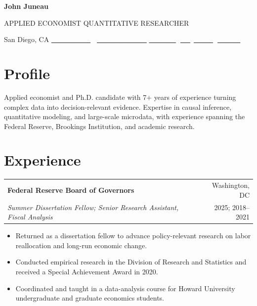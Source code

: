 \documentclass[10pt,letterpaper]{article}
\makeatletter
\newcommand{\entry}[4]{%
  \begin{tabularx}{\linewidth}{@{}Xr@{}}
    {\fontsize{10.35}{11.5}\selectfont\bfseries\color{navy}#1} &
    {\headingfont\fontsize{9.2}{10.5}\selectfont\color{slate}#2} \\
    {\fontsize{9.7}{10.8}\selectfont\itshape#3} &
    {\headingfont\fontsize{9.2}{10.5}\selectfont\color{teal}#4}
  \end{tabularx}\vspace{-1.5pt}
}
\makeatother
\begin{document}

\color{white}
{\fontsize{30}{32}\selectfont\bfseries John Juneau}\par
\vspace{1pt}
{\headingfont\fontsize{10.2}{12}\selectfont{}
  APPLIED ECONOMIST \enspace\textcolor{teal}{\textbullet}\enspace QUANTITATIVE RESEARCHER
}\par
\vspace{9pt}
{\headingfont\fontsize{8.9}{10.5}\selectfont
  San Diego, CA
  \enspace\textcolor{teal}{\textbullet}\enspace
  \href{tel:+12243307443}{\textcolor{white}{224-330-7443}}
  \enspace\textcolor{teal}{\textbullet}\enspace
  \href{mailto:jjuneau@ucsd.edu}{\textcolor{white}{jjuneau@ucsd.edu}}
  \enspace\textcolor{teal}{\textbullet}\enspace
  \href{https://www.linkedin.com/in/john-juneau-016022100/}{\textcolor{white}{LinkedIn}}
  \enspace\textcolor{teal}{\textbullet}\enspace
  \href{https://johnjuneau.github.io}{\textcolor{white}{johnjuneau.github.io}}
}\par

\vspace{0.31in}
\color{ink}

\section{Profile}
Applied economist and Ph.D. candidate with 7+ years of experience turning complex data into decision-relevant evidence. Expertise in causal inference, quantitative modeling, and large-scale microdata, with experience spanning the Federal Reserve, Brookings Institution, and academic research.

\section{Experience}
\entry{Federal Reserve Board of Governors}{Washington, DC}{Summer Dissertation Fellow; Senior Research Assistant, Fiscal Analysis}{2025; 2018--2021}
\begin{itemize}
  \item Returned as a dissertation fellow to advance policy-relevant research on labor reallocation and long-run economic change.
  \item Conducted empirical research in the Division of Research and Statistics and received a Special Achievement Award in 2020.
  \item Coordinated and taught in a data-analysis course for Howard University undergraduate and graduate economics students.
\end{itemize}
\end{document}
